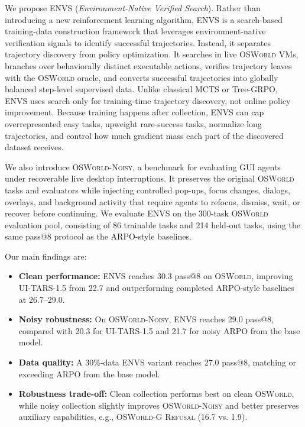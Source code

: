 \documentclass[11pt]{article}
\begin{document}
We propose \textsc{ENVS} (\emph{Environment-Native Verified Search}). Rather than introducing a new reinforcement learning algorithm, \textsc{ENVS} is a search-based training-data construction framework that leverages environment-native verification signals to identify successful trajectories. Instead, it separates trajectory discovery from policy optimization. It searches in live \textsc{OSWorld} VMs, branches over behaviorally distinct executable actions, verifies trajectory leaves with the \textsc{OSWorld} oracle, and converts successful trajectories into globally balanced step-level supervised data. Unlike classical MCTS or Tree-GRPO, \textsc{ENVS} uses search only for training-time trajectory discovery, not online policy improvement. Because training happens after collection, \textsc{ENVS} can cap overrepresented easy tasks, upweight rare-success tasks, normalize long trajectories, and control how much gradient mass each part of the discovered dataset receives. 

We also introduce \textsc{OSWorld-Noisy}, a benchmark for evaluating GUI agents under recoverable live desktop interruptions. It preserves the original \textsc{OSWorld} tasks and evaluators while injecting controlled pop-ups, focus changes, dialogs, overlays, and background activity that require agents to refocus, dismiss, wait, or recover before continuing.
%
We evaluate \textsc{ENVS} on the 300-task \textsc{OSWorld} evaluation pool, consisting of 86 trainable tasks and 214 held-out tasks, using the same pass@8 protocol as the ARPO-style baselines. 

Our main findings are:

\begin{itemize}[leftmargin=*, itemsep=0.15em, topsep=0.15em, parsep=0pt, partopsep=0pt]
    \item \textbf{Clean performance:} \textsc{ENVS} reaches 30.3 pass@8 on \textsc{OSWorld}, improving UI-TARS-1.5 from 22.7 and outperforming completed ARPO-style baselines at 26.7--29.0.
    \item \textbf{Noisy robustness:} On \textsc{OSWorld-Noisy}, \textsc{ENVS} reaches 29.0 pass@8, compared with 20.3 for UI-TARS-1.5 and 21.7 for noisy ARPO from the base model.
    \item \textbf{Data quality:} A 30\%-data \textsc{ENVS} variant reaches 27.0 pass@8, matching or exceeding ARPO from the base model.
    \item \textbf{Robustness trade-off:} Clean collection performs best on clean \textsc{OSWorld}, while noisy collection slightly improves \textsc{OSWorld-Noisy} and better preserves auxiliary capabilities, e.g., \textsc{OSWorld-G Refusal} (16.7 vs. 1.9).
\end{itemize}
\end{document}
